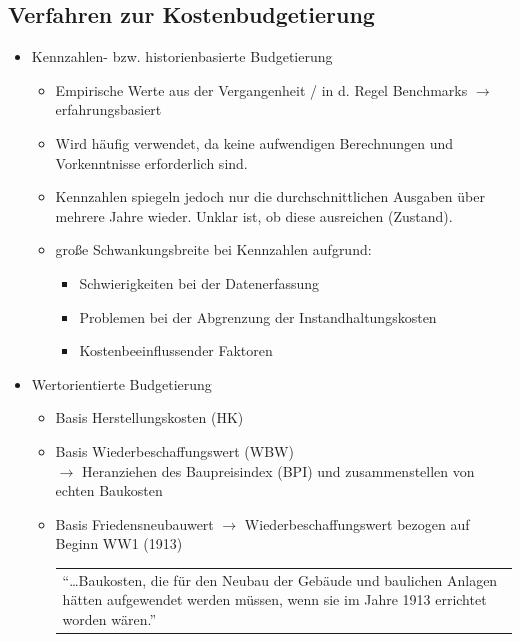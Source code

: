 \documentclass[fleqn,twoside,dvipsnames]{article}
\begin{document}
    \subsection{Verfahren zur Kostenbudgetierung}
        \begin{itemize}
            \item Kennzahlen- bzw. historienbasierte Budgetierung
                \begin{itemize}
                    \item Empirische Werte aus der Vergangenheit / in d. Regel Benchmarks $\rightarrow$ erfahrungsbasiert
                    \item Wird häufig verwendet, da keine aufwendigen Berechnungen und Vorkenntnisse erforderlich sind.
                    \item Kennzahlen spiegeln jedoch nur die durchschnittlichen Ausgaben über mehrere Jahre wieder. Unklar ist, ob diese ausreichen (Zustand).
                    \item große Schwankungsbreite bei Kennzahlen aufgrund:
                        \begin{itemize}
                            \item Schwierigkeiten bei der Datenerfassung
                            \item  Problemen bei der Abgrenzung der Instandhaltungskosten
                            \item  Kostenbeeinflussender Faktoren
                        \end{itemize}
                \end{itemize}
            \item Wertorientierte Budgetierung 
                \begin{itemize}
                    \item Basis Herstellungskosten (HK)
                    \item Basis Wiederbeschaffungswert (WBW) \\
                        $\rightarrow$ Heranziehen des Baupreisindex (BPI) und zusammenstellen von echten Baukosten\label{WBW}
                    \item Basis Friedensneubauwert $\rightarrow$ Wiederbeschaffungswert bezogen auf Beginn WW1 (1913)\\
                        \begin{tabular}{|p{13cm}}\enquote{…Baukosten, die für den Neubau der Gebäude und baulichen Anlagen hätten aufgewendet werden müssen, wenn sie im Jahre 1913 errichtet worden wären.}\end{tabular} \vspace{1.5mm}

\end{itemize}
\end{itemize}
\end{document}
